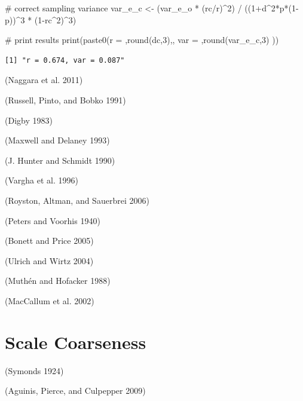 \documentclass[
  letterpaper,
  DIV=11,
  numbers=noendperiod]{scrreprt}
\newenvironment{Shaded}{\begin{snugshade}}{\end{snugshade}}
\newcommand{\CommentTok}[1]{\textcolor[rgb]{0.37,0.37,0.37}{#1}}
\newcommand{\DecValTok}[1]{\textcolor[rgb]{0.68,0.00,0.00}{#1}}
\newcommand{\FunctionTok}[1]{\textcolor[rgb]{0.28,0.35,0.67}{#1}}
\newcommand{\NormalTok}[1]{\textcolor[rgb]{0.00,0.23,0.31}{#1}}
\newcommand{\OtherTok}[1]{\textcolor[rgb]{0.00,0.23,0.31}{#1}}
\newcommand{\SpecialCharTok}[1]{\textcolor[rgb]{0.37,0.37,0.37}{#1}}
\newcommand{\StringTok}[1]{\textcolor[rgb]{0.13,0.47,0.30}{#1}}
\begin{document}
\begin{Shaded}
\begin{Highlighting}[]
\CommentTok{\# correct sampling variance}
\NormalTok{var\_e\_c }\OtherTok{\textless{}{-}}\NormalTok{ (var\_e\_o }\SpecialCharTok{*}\NormalTok{ (rc}\SpecialCharTok{/}\NormalTok{r)}\SpecialCharTok{\^{}}\DecValTok{2}\NormalTok{) }\SpecialCharTok{/}\NormalTok{ ((}\DecValTok{1}\SpecialCharTok{+}\NormalTok{d}\SpecialCharTok{\^{}}\DecValTok{2}\SpecialCharTok{*}\NormalTok{p}\SpecialCharTok{*}\NormalTok{(}\DecValTok{1}\SpecialCharTok{{-}}\NormalTok{p))}\SpecialCharTok{\^{}}\DecValTok{3} \SpecialCharTok{*}\NormalTok{ (}\DecValTok{1}\SpecialCharTok{{-}}\NormalTok{rc}\SpecialCharTok{\^{}}\DecValTok{2}\NormalTok{)}\SpecialCharTok{\^{}}\DecValTok{3}\NormalTok{)}

\CommentTok{\# print results}
\FunctionTok{print}\NormalTok{(}\FunctionTok{paste0}\NormalTok{(}\StringTok{\textquotesingle{}r = \textquotesingle{}}\NormalTok{,}\FunctionTok{round}\NormalTok{(dc,}\DecValTok{3}\NormalTok{),}\StringTok{\textquotesingle{}, var = \textquotesingle{}}\NormalTok{,}\FunctionTok{round}\NormalTok{(var\_e\_c,}\DecValTok{3}\NormalTok{) ))}
\end{Highlighting}
\end{Shaded}

\begin{verbatim}
[1] "r = 0.674, var = 0.087"
\end{verbatim}

(Naggara et al. 2011)

(Russell, Pinto, and Bobko 1991)

(Digby 1983)

(Maxwell and Delaney 1993)

(J. Hunter and Schmidt 1990)

(Vargha et al. 1996)

(Royston, Altman, and Sauerbrei 2006)

(Peters and Voorhis 1940)

(Bonett and Price 2005)

(Ulrich and Wirtz 2004)

(Muthén and Hofacker 1988)

(MacCallum et al. 2002)

\hypertarget{scale-coarseness}{%
\chapter{Scale Coarseness}\label{scale-coarseness}}

(Symonds 1924)

(Aguinis, Pierce, and Culpepper 2009)
\end{document}
